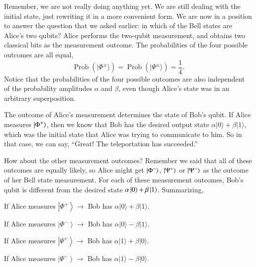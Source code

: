 Remember, we are not really doing anything yet. 
We are still dealing with the initial state, just rewriting it in a more convenient form.
We are now in a position to answer the question that we asked earlier: in which of the Bell states are Alice's two qubits?
Alice performs the two-qubit measurement, and obtains two classical bits as the measurement outcome.
The probabilities of the four possible outcomes are all equal,
\begin{equation}
    \operatorname{Prob}\left(|\Phi^{\pm}\rangle\right)=\operatorname{Prob}\left(|\Psi^{\pm}\rangle\right)=\frac{1}{4}.
\end{equation}
Notice that the probabilities of the four possible outcomes are also independent of the probability amplitudes $\alpha$ and $\beta$, even though Alice's state was in an arbitrary superposition.

The outcome of Alice's measurement determines the state of Bob's qubit.
If Alice measures $\left| \Phi^+ \right\rangle$, then we know that Bob has the desired output state $\alpha|0\rangle+\beta|1\rangle$, which was the initial state that Alice was trying to communicate to him.
So in that case, we can say, ``Great! The teleportation has succeeded.''

How about the other measurement outcomes?
Remember we said that all of these outcomes are equally likely, so Alice might get $\left| \Phi^- \right\rangle$, $\left| \Psi^+ \right\rangle$ or $\left| \Psi^- \right\rangle$ as the outcome of her Bell state measurement.
For each of these measurement outcomes, Bob's qubit is different from the desired state $\alpha\left| 0 \right\rangle+\beta\left| 1 \right\rangle$.
Summarizing,

\hspace{2cm} If Alice measures $\left|\Phi^{+}\right\rangle \rightarrow$ Bob has $\alpha|0\rangle+\beta|1\rangle$.

\hspace{2cm} If Alice measures $\left|\Phi^{-}\right\rangle \rightarrow$ Bob has $\alpha|0\rangle-\beta|1\rangle$.

\hspace{2cm} If Alice measures $\left|\Psi^{+}\right\rangle \rightarrow$ Bob has $\alpha|1\rangle+\beta|0\rangle$.

\hspace{2cm} If Alice measures $\left|\Psi^{-}\right\rangle \rightarrow$ Bob has $\alpha|1\rangle-\beta|0\rangle$.

